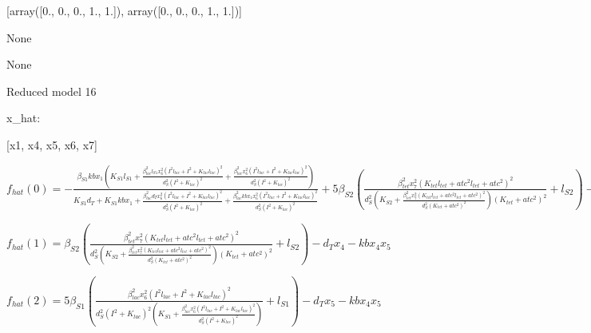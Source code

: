 [array([0., 0., 0., 1., 1.]), array([0., 0., 0., 1., 1.])]

None

None

Reduced model 16

x_{hat}: 

[x1, x4, x5, x6, x7]


$f_{hat}(0)=- \frac{\beta_{S1} kb x_{1} \left(K_{S1} l_{S1} + \frac{\beta_{lac}^{2} l_{S1} x_{6}^{2} \left(I^{2} l_{lac} + I^{2} + K_{lac} l_{lac}\right)^{2}}{d_{S}^{2} \left(I^{2} + K_{lac}\right)^{2}} + \frac{\beta_{lac}^{2} x_{6}^{2} \left(I^{2} l_{lac} + I^{2} + K_{lac} l_{lac}\right)^{2}}{d_{S}^{2} \left(I^{2} + K_{lac}\right)^{2}}\right)}{K_{S1} d_{T} + K_{S1} kb x_{1} + \frac{\beta_{lac}^{2} d_{T} x_{6}^{2} \left(I^{2} l_{lac} + I^{2} + K_{lac} l_{lac}\right)^{2}}{d_{S}^{2} \left(I^{2} + K_{lac}\right)^{2}} + \frac{\beta_{lac}^{2} kb x_{1} x_{6}^{2} \left(I^{2} l_{lac} + I^{2} + K_{lac} l_{lac}\right)^{2}}{d_{S}^{2} \left(I^{2} + K_{lac}\right)^{2}}} + 5 \beta_{S2} \left(\frac{\beta_{tet}^{2} x_{7}^{2} \left(K_{tet} l_{tet} + atc^{2} l_{tet} + atc^{2}\right)^{2}}{d_{S}^{2} \left(K_{S2} + \frac{\beta_{tet}^{2} x_{7}^{2} \left(K_{tet} l_{tet} + atc^{2} l_{tet} + atc^{2}\right)^{2}}{d_{S}^{2} \left(K_{tet} + atc^{2}\right)^{2}}\right) \left(K_{tet} + atc^{2}\right)^{2}} + l_{S2}\right) - d_{T} x_{1}$


$f_{hat}(1)=\beta_{S2} \left(\frac{\beta_{tet}^{2} x_{7}^{2} \left(K_{tet} l_{tet} + atc^{2} l_{tet} + atc^{2}\right)^{2}}{d_{S}^{2} \left(K_{S2} + \frac{\beta_{tet}^{2} x_{7}^{2} \left(K_{tet} l_{tet} + atc^{2} l_{tet} + atc^{2}\right)^{2}}{d_{S}^{2} \left(K_{tet} + atc^{2}\right)^{2}}\right) \left(K_{tet} + atc^{2}\right)^{2}} + l_{S2}\right) - d_{T} x_{4} - kb x_{4} x_{5}$


$f_{hat}(2)=5 \beta_{S1} \left(\frac{\beta_{lac}^{2} x_{6}^{2} \left(I^{2} l_{lac} + I^{2} + K_{lac} l_{lac}\right)^{2}}{d_{S}^{2} \left(I^{2} + K_{lac}\right)^{2} \left(K_{S1} + \frac{\beta_{lac}^{2} x_{6}^{2} \left(I^{2} l_{lac} + I^{2} + K_{lac} l_{lac}\right)^{2}}{d_{S}^{2} \left(I^{2} + K_{lac}\right)^{2}}\right)} + l_{S1}\right) - d_{T} x_{5} - kb x_{4} x_{5}$


